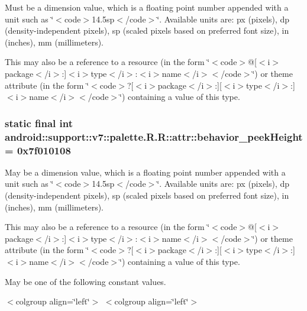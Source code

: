 Must be a dimension value, which is a floating point number appended with a unit such as \char`\"{}$<$code$>$14.5sp$<$/code$>$\char`\"{}. Available units are: px (pixels), dp (density-independent pixels), sp (scaled pixels based on preferred font size), in (inches), mm (millimeters). 

This may also be a reference to a resource (in the form \char`\"{}$<$code$>$@\mbox{[}$<$i$>$package$<$/i$>$:\mbox{]}$<$i$>$type$<$/i$>$:$<$i$>$name$<$/i$>$$<$/code$>$\char`\"{}) or theme attribute (in the form \char`\"{}$<$code$>$?\mbox{[}$<$i$>$package$<$/i$>$:\mbox{]}\mbox{[}$<$i$>$type$<$/i$>$:\mbox{]}$<$i$>$name$<$/i$>$$<$/code$>$\char`\"{}) containing a value of this type. \hypertarget{classandroid_1_1support_1_1v7_1_1palette_1_1_r_1_1attr_9c04d9c7bdabbe1af83e96cc5ee2b188}{
\subsubsection[{behavior\_\-peekHeight}]{\setlength{\rightskip}{0pt plus 5cm}static final int android::support::v7::palette.R.R::attr::behavior\_\-peekHeight = 0x7f010108}}
\label{classandroid_1_1support_1_1v7_1_1palette_1_1_r_1_1attr_9c04d9c7bdabbe1af83e96cc5ee2b188}


May be a dimension value, which is a floating point number appended with a unit such as \char`\"{}$<$code$>$14.5sp$<$/code$>$\char`\"{}. Available units are: px (pixels), dp (density-independent pixels), sp (scaled pixels based on preferred font size), in (inches), mm (millimeters). 

This may also be a reference to a resource (in the form \char`\"{}$<$code$>$@\mbox{[}$<$i$>$package$<$/i$>$:\mbox{]}$<$i$>$type$<$/i$>$:$<$i$>$name$<$/i$>$$<$/code$>$\char`\"{}) or theme attribute (in the form \char`\"{}$<$code$>$?\mbox{[}$<$i$>$package$<$/i$>$:\mbox{]}\mbox{[}$<$i$>$type$<$/i$>$:\mbox{]}$<$i$>$name$<$/i$>$$<$/code$>$\char`\"{}) containing a value of this type. 

May be one of the following constant values. \begin{TabularC}{0}
\hline
\end{TabularC}
$<$colgroup align=\char`\"{}left\char`\"{}$>$ $<$colgroup align=\char`\"{}left\char`\"{}$>$ 

